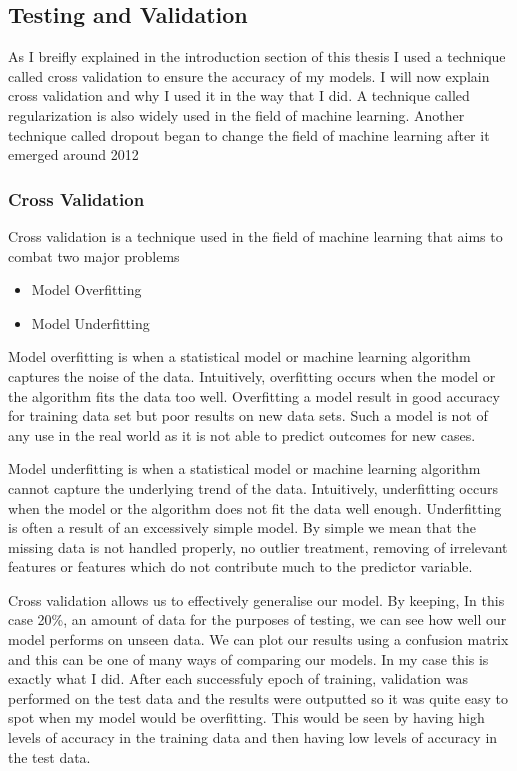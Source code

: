 \subsection{Testing and Validation}
As I breifly explained in the introduction section of this thesis I used a technique called cross validation to ensure the accuracy of my models. I will now explain cross validation and why I used it in the way that I did. A technique called regularization is also widely used in the field of machine learning. Another technique called dropout began to change the field of machine learning after it emerged around 2012

\subsubsection{Cross Validation}
Cross validation is a technique used in the field of machine learning that aims to combat two major problems

\begin{itemize}
	\item Model Overfitting
	\item Model Underfitting
\end{itemize}
Model overfitting is when a statistical model or machine learning algorithm captures the noise of the data. Intuitively, overfitting occurs when the model or the algorithm fits the data too well.
Overfitting a model result in good accuracy for training data set but poor results on new data sets. Such a model is not of any use in the real world as it is not able to predict outcomes for new cases.

Model underfitting is when a statistical model or machine learning algorithm cannot capture the underlying trend of the data. Intuitively, underfitting occurs when the model or the algorithm does not fit the data well enough. Underfitting is often a result of an excessively simple model. By simple we mean that the missing data is not handled properly, no outlier treatment, removing of irrelevant features or features which do not contribute much to the predictor variable. 

Cross validation allows us to effectively generalise our model. By keeping, In this case 20\%, an amount of data for the purposes of testing, we can see how well our model performs on unseen data. We can plot our results using a confusion matrix and this can be one of many ways of comparing our models. In my case this is exactly what I did. After each successfuly epoch of training, validation was performed on the test data and the results were outputted so it was quite easy to spot when my model would be overfitting. This would be seen by having high levels of accuracy in the training data and then having low levels of accuracy in the test data.


